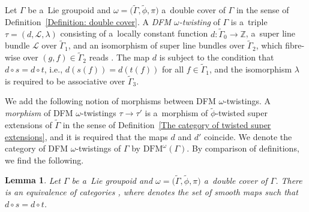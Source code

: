 \documentclass[pdftex]{sigma}
\numberwithin{equation}{section}
\newtheorem{Lemma}[Theorem]{Lemma}
\def\Z {\mathbb{Z}}
\begin{document}
\begin{Definition} \label{definition: DFM-twisting}
 Let $\Gamma$ be a~Lie groupoid and $\omega=\bigl(\tilde\Gamma,\tilde\phi,\pi\bigr)$ a~double cover of $\Gamma$ in the sense of Definition~\ref{Definition: double cover}.
 A \emph{DFM $\omega$-twisting} of $\Gamma$ is a~triple $\tau = (d,\mathcal{L},\lambda)$ consisting of a~locally constant function
 $d \colon \tilde\Gamma_0 \to \mathbb{Z}$, a~super line bundle $\mathcal{L}$ over $\tilde\Gamma_1$,
 and an isomorphism of super line bundles over $\tilde\Gamma_2$, which fibre-wise over $(g,f) \in \tilde\Gamma_2$ reads
.
 The map $d$ is subject to the condition that $d \circ s=d\circ t$, i.e.,
 $d(s(f)) = d(t(f))$ for all $f \in \tilde\Gamma_1$, and the isomorphism $\lambda$ is required
 to be associative over $\tilde\Gamma_3$.
\end{Definition}

We add the following notion of morphisms between DFM $\omega$-twistings.
 A \emph{morphism} of DFM $\omega$-twistings
 $\tau \to \tau'$ is a~morphism of $\tilde \phi$-twisted super extensions of $\tilde\Gamma$ in the sense of Definition~\ref{The category of twisted super extensions}, and it is required that the maps $d$ and $d'$ coincide.
We denote the category of DFM $\omega$-twistings of $\Gamma$ by $\mathrm{DFM}^\omega(\Gamma)$.
By comparison of definitions, we find the following.

\begin{Lemma} \label{lemma: DFM twistings via FM category}
 Let $\Gamma$ be a~Lie groupoid and $\omega=\bigl(\tilde\Gamma,\tilde\phi,\pi\bigr)$ a~double cover of $\Gamma$.
 There is an equivalence of categories
\smash{$
 \mathrm{DFM}(\Gamma)^\omega \cong C^{\infty}\bigl(\tilde \Gamma,\Z\bigr)_{\rm dis} \times \mathrm{FM}\bigl(\tilde\Gamma,\tilde\phi\bigr)$},
where \smash{$C^{\infty}\bigl(\tilde \Gamma,\Z\bigr)$} denotes the set of smooth maps \smash{$d \colon \tilde\Gamma_0 \to \Z$} such that $d \circ s=d\circ t$.
\end{Lemma}
\end{document}
